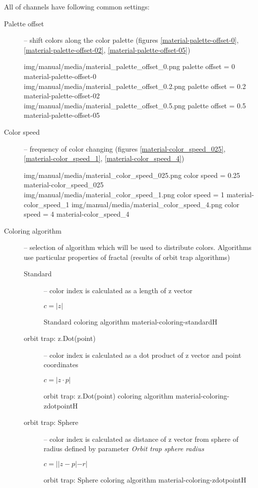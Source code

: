 All of channels have following common settings:
\begin{description}
	\item[Palette offset] -- shift colors along the color palette (figures \ref{material-palette-offset-0}, \ref{material-palette-offset-02}, \ref{material-palette-offset-05})
	
	\threeImagesWithTwoCaptionsFullWidth
	{img/manual/media/material_palette_offset_0.png}
	{palette offset = 0}
	{material-palette-offset-0}
	{img/manual/media/material_palette_offset_0.2.png}
	{palette offset = 0.2}
	{material-palette-offset-02}
	{img/manual/media/material_palette_offset_0.5.png}
	{palette offset = 0.5}
	{material-palette-offset-05}
	
	\item[Color speed] -- frequency of color changing (figures \ref{material-color_speed_025}, \ref{material-color_speed_1}, \ref{material-color_speed_4})
	
	\threeImagesWithTwoCaptionsFullWidth
	{img/manual/media/material_color_speed_025.png}
	{color speed = 0.25}
	{material-color_speed_025}
	{img/manual/media/material_color_speed_1.png}
	{color speed = 1}
	{material-color_speed_1}
	{img/manual/media/material_color_speed_4.png}
	{color speed = 4}
	{material-color_speed_4}
	
	\item[Coloring algorithm] -- selection of algorithm which will be used to distribute colors. Algorithms use particular properties of fractal (results of orbit trap algorithms)
	\begin{description}
		\item[Standard] -- color index is calculated as a length of z vector
		\begin{center}
			\(c = |z|\)
		\end{center}
		{Standard coloring algorithm}
		{material-coloring-standard}{H}
		
		\item[orbit trap: z.Dot(point)] -- color index is calculated as a dot product of z vector and point coordinates
		\begin{center}
			\(c = |z \cdot p|\)
		\end{center}
		{orbit trap: z.Dot(point) coloring algorithm}
		{material-coloring-zdotpoint}{H}
		
		\item[orbit trap: Sphere] -- color index is calculated as distance of z vector from sphere of radius defined by parameter \emph{Orbit trap sphere radius}
		\begin{center}
			\(c = ||z - p|-r|\)
		\end{center}
		{orbit trap: Sphere coloring algorithm}
		{material-coloring-zdotpoint}{H}
		

\end{description}
\end{description}

